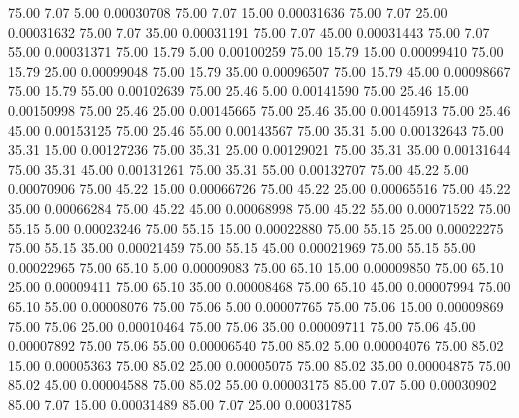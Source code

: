      75.00      7.07      5.00     0.00030708
     75.00      7.07     15.00     0.00031636
     75.00      7.07     25.00     0.00031632
     75.00      7.07     35.00     0.00031191
     75.00      7.07     45.00     0.00031443
     75.00      7.07     55.00     0.00031371
     75.00     15.79      5.00     0.00100259
     75.00     15.79     15.00     0.00099410
     75.00     15.79     25.00     0.00099048
     75.00     15.79     35.00     0.00096507
     75.00     15.79     45.00     0.00098667
     75.00     15.79     55.00     0.00102639
     75.00     25.46      5.00     0.00141590
     75.00     25.46     15.00     0.00150998
     75.00     25.46     25.00     0.00145665
     75.00     25.46     35.00     0.00145913
     75.00     25.46     45.00     0.00153125
     75.00     25.46     55.00     0.00143567
     75.00     35.31      5.00     0.00132643
     75.00     35.31     15.00     0.00127236
     75.00     35.31     25.00     0.00129021
     75.00     35.31     35.00     0.00131644
     75.00     35.31     45.00     0.00131261
     75.00     35.31     55.00     0.00132707
     75.00     45.22      5.00     0.00070906
     75.00     45.22     15.00     0.00066726
     75.00     45.22     25.00     0.00065516
     75.00     45.22     35.00     0.00066284
     75.00     45.22     45.00     0.00068998
     75.00     45.22     55.00     0.00071522
     75.00     55.15      5.00     0.00023246
     75.00     55.15     15.00     0.00022880
     75.00     55.15     25.00     0.00022275
     75.00     55.15     35.00     0.00021459
     75.00     55.15     45.00     0.00021969
     75.00     55.15     55.00     0.00022965
     75.00     65.10      5.00     0.00009083
     75.00     65.10     15.00     0.00009850
     75.00     65.10     25.00     0.00009411
     75.00     65.10     35.00     0.00008468
     75.00     65.10     45.00     0.00007994
     75.00     65.10     55.00     0.00008076
     75.00     75.06      5.00     0.00007765
     75.00     75.06     15.00     0.00009869
     75.00     75.06     25.00     0.00010464
     75.00     75.06     35.00     0.00009711
     75.00     75.06     45.00     0.00007892
     75.00     75.06     55.00     0.00006540
     75.00     85.02      5.00     0.00004076
     75.00     85.02     15.00     0.00005363
     75.00     85.02     25.00     0.00005075
     75.00     85.02     35.00     0.00004875
     75.00     85.02     45.00     0.00004588
     75.00     85.02     55.00     0.00003175
     85.00      7.07      5.00     0.00030902
     85.00      7.07     15.00     0.00031489
     85.00      7.07     25.00     0.00031785
